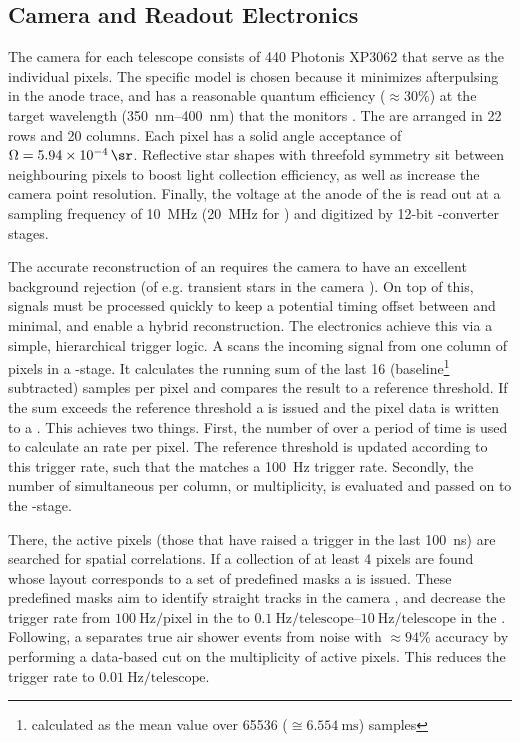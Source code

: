 \subsection{Camera and Readout Electronics}

The camera for each telescope consists of 440 Photonis XP3062 \PMTs that serve 
as the individual pixels. The specific model is chosen because it minimizes 
afterpulsing in the anode trace, and has a reasonable quantum efficiency 
($\approx30\%$) at the target wavelength (\SIrange{350}{400}{\nano\meter}) that 
the \FD monitors \cite{xiaoCalibrationPhotonisXP30622005}. The \PMTs are 
arranged in 22 rows and 20 columns. Each pixel has a solid angle acceptance of 
$\Omega = \SI{5.94e-4}{\sr}$. Reflective star shapes with threefold symmetry 
sit between neighbouring pixels to boost light collection efficiency, as well as
increase the camera point resolution. Finally, the voltage at the anode of the 
\PMTs is read out at a sampling frequency of \SI{10}{\mega\hertz} 
(\SI{20}{\mega\hertz} for \HEAT) and digitized by 12-bit \ADC-converter stages. 

The accurate reconstruction of an \EAS requires the camera to have an excellent 
background rejection (of e.g. transient stars in the camera \FOV). On top of 
this, signals must be processed quickly to keep a potential timing offset 
between \FD and \SD minimal, and enable a hybrid reconstruction. The \FD 
electronics achieve this via a simple, hierarchical trigger logic. A \FPGA 
scans the incoming signal from one column of pixels in a \FLT-stage. It 
calculates the running sum of the last 16 (baseline\footnote{calculated as the 
mean \ADC value over 65536 ($\cong\SI{6.554}{\milli\second}$) samples} 
subtracted) \ADC samples per pixel and compares the result to a reference 
threshold. If the sum exceeds the reference threshold a \FLT is issued and the 
pixel data is written to a \SRAM. This achieves two things. First, the number of
\FLTs over a period of time is used to calculate an \FLT rate per pixel. The 
reference threshold is updated according to this trigger rate, such that the 
\FLT matches a \SI{100}{\hertz} trigger rate. Secondly, the number of 
simultaneous \FLTs per column, or multiplicity, is evaluated and passed on to 
the \SLT-stage.

There, the active pixels (those that have raised a trigger in the last 
\SI{100}{\nano\second}) are searched for spatial correlations. If a collection 
of at least 4 pixels are found whose layout corresponds to a set of predefined
masks a \SLT is issued. These predefined masks aim to identify straight tracks 
in the camera \FOV, and decrease the trigger rate from 
$\SI{100}{\hertz\per\mathrm{pixel}}$ in the \FLT to 
$\SIrange{0.1}{10}{\hertz\per\mathrm{telescope}}$ in the \SLT. Following, a \TLT
separates true air shower events from noise with $\approx94\%$ accuracy by 
performing a data-based cut on the multiplicity of active pixels. This reduces 
the trigger rate to $\SI{0.01}{\hertz\per\mathrm{telescope}}$. 

